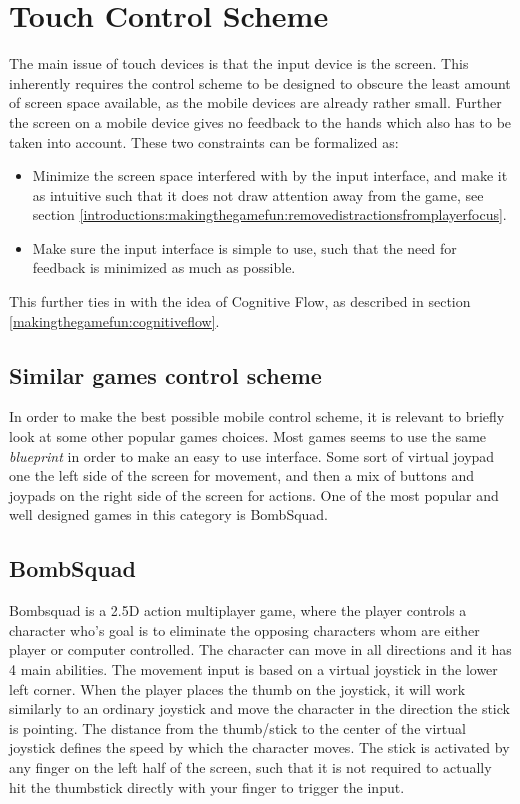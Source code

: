 \section{Touch Control Scheme}
The main issue of touch devices is that the input device is the screen.
This inherently requires the control scheme to be designed to obscure the least amount of screen space available, as the mobile devices are already rather small.
Further the screen on a mobile device gives no feedback to the hands which also has to be taken into account.
These two constraints can be formalized as:
\begin{itemize}
\item Minimize the screen space interfered with by the input interface, and make it as intuitive such that it does not draw attention away from the game, see section \ref{introductions:makingthegamefun:removedistractionsfromplayerfocus}.
\item Make sure the input interface is simple to use, such that the need for feedback is minimized as much as possible.
\end{itemize}
This further ties in with the idea of Cognitive Flow, as described in section \ref{makingthegamefun:cognitiveflow}.

\subsection{Similar games control scheme}
In order to make the best possible mobile control scheme, it is relevant to briefly look at some other popular games choices.
Most games seems to use the same \emph{blueprint} in order to make an easy to use interface. Some sort of virtual joypad one the left side of the screen for movement, and then a mix of buttons and joypads on the right side of the screen for actions. 
One of the most popular and well designed games in this category is BombSquad.

\subsection*{BombSquad}\label{sec:modules:controlscheme:bombsquad}
Bombsquad\cite{bombsquad} is a 2.5D action multiplayer game, where the player controls a character who's goal is to eliminate the opposing characters whom are either player or computer controlled.
The character can move in all directions and it has 4 main abilities. 
The movement input is based on a virtual joystick in the lower left corner.
When the player places the thumb on the joystick, it will work similarly to an ordinary joystick and move the character in the direction the stick is pointing. 
The distance from the thumb/stick to the center of the virtual joystick defines the speed by which the character moves. 
The stick is activated by any finger on the left half of the screen, such that it is not required to actually hit the thumbstick directly with your finger to trigger the input.

